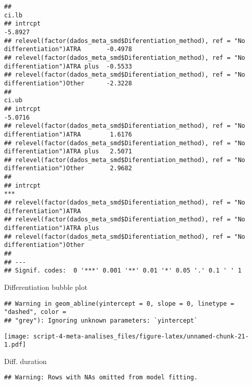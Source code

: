 \documentclass[
]{article}
\begin{document}
\begin{verbatim}
##                                                                                               ci.lb 
## intrcpt                                                                                     -5.8927 
## relevel(factor(dados_meta_smd$Diferentiation_method), ref = "No differentiation")ATRA       -0.4978 
## relevel(factor(dados_meta_smd$Diferentiation_method), ref = "No differentiation")ATRA plus  -0.5533 
## relevel(factor(dados_meta_smd$Diferentiation_method), ref = "No differentiation")Other      -2.3228 
##                                                                                               ci.ub 
## intrcpt                                                                                     -5.0716 
## relevel(factor(dados_meta_smd$Diferentiation_method), ref = "No differentiation")ATRA        1.6176 
## relevel(factor(dados_meta_smd$Diferentiation_method), ref = "No differentiation")ATRA plus   2.5071 
## relevel(factor(dados_meta_smd$Diferentiation_method), ref = "No differentiation")Other       2.9682 
##                                                                                                 
## intrcpt                                                                                     *** 
## relevel(factor(dados_meta_smd$Diferentiation_method), ref = "No differentiation")ATRA           
## relevel(factor(dados_meta_smd$Diferentiation_method), ref = "No differentiation")ATRA plus      
## relevel(factor(dados_meta_smd$Diferentiation_method), ref = "No differentiation")Other          
## 
## ---
## Signif. codes:  0 '***' 0.001 '**' 0.01 '*' 0.05 '.' 0.1 ' ' 1
\end{verbatim}

Differentiation bubble plot

\begin{verbatim}
## Warning in geom_abline(yintercept = 0, slope = 0, linetype = "dashed", color =
## "grey"): Ignoring unknown parameters: `yintercept`
\end{verbatim}

\texttt{[image: script-4-meta-analises\_files/figure-latex/unnamed-chunk-21-1.pdf]}

Diff. duration

\begin{verbatim}
## Warning: Rows with NAs omitted from model fitting.
\end{verbatim}
\end{document}
